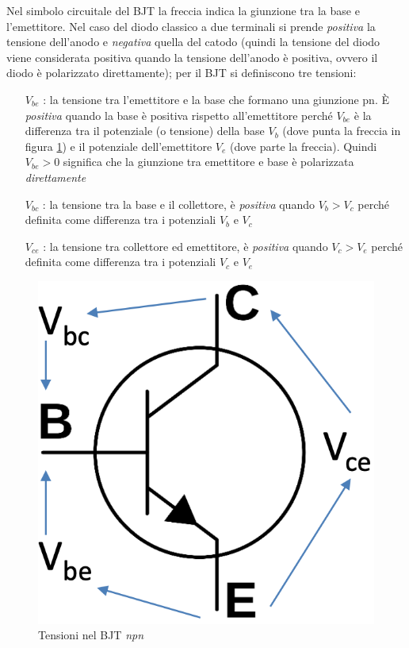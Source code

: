 \documentclass[12pt, a4paper]{report}
\begin{document}
Nel simbolo circuitale del BJT la freccia indica la giunzione tra la base e l'emettitore. Nel caso del diodo classico a due terminali si prende \textit{positiva} la tensione dell'anodo e \textit{negativa} quella del catodo (quindi la tensione del diodo viene considerata positiva quando la tensione dell'anodo è positiva, ovvero il diodo è polarizzato direttamente); per il BJT si definiscono tre tensioni:
\begin{itemize}
    \item[$V_{be}$]: la tensione tra l'emettitore e la base che formano una giunzione pn. È \textit{positiva} quando la base è positiva rispetto all'emettitore perché $V_{be}$ è la differenza tra il potenziale (o tensione) della base $V_{b}$ (dove punta la freccia in figura \ref{tensioni_bjt}) e il potenziale dell'emettitore $V_{e}$ (dove parte la freccia). Quindi $V_{be} > 0$ significa che la giunzione tra emettitore e base è polarizzata \textit{direttamente}
    \item[$V_{bc}$]: la tensione tra la base e il collettore, è \textit{positiva} quando $V_{b} > V_{c}$ perché definita come differenza tra i potenziali $V_{b}$ e $V_{c}$
    \item[$V_{ce}$]: la tensione tra collettore ed emettitore, è \textit{positiva} quando $V_{c} > V_{e}$ perché definita come differenza tra i potenziali $V_{c}$ e $V_{e}$
\end{itemize}
\begin{figure}[h]
    \centering
    \includegraphics[scale=0.4,angle=0]{bjt_tensioni.png}
    \caption{Tensioni nel BJT \textit{npn}}
    \label{tensioni_bjt}
\end{figure}
\end{document}
